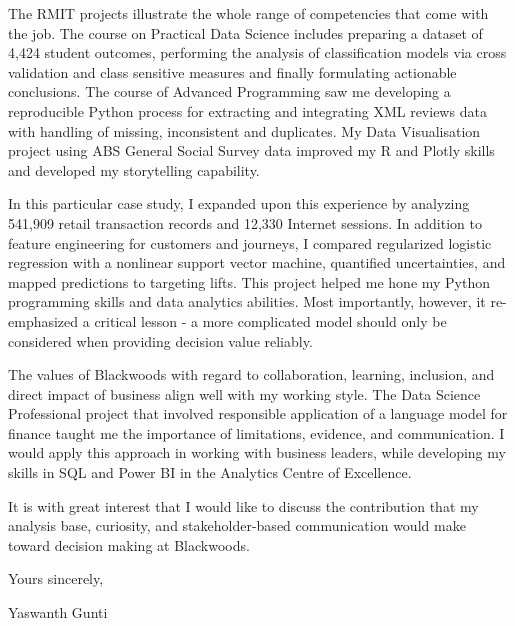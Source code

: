 \medskip
\noindent The RMIT projects illustrate the whole range of competencies that come with the job. The course on Practical Data Science includes preparing a dataset of 4,424 student outcomes, performing the analysis of classification models via cross validation and class sensitive measures and finally formulating actionable conclusions. The course of Advanced Programming saw me developing a reproducible Python process for extracting and integrating XML reviews data with handling of missing, inconsistent and duplicates. My Data Visualisation project using ABS General Social Survey data improved my R and Plotly skills and developed my storytelling capability.

\medskip
\noindent In this particular case study, I expanded upon this experience by analyzing 541,909 retail transaction records and 12,330 Internet sessions. In addition to feature engineering for customers and journeys, I compared regularized logistic regression with a nonlinear support vector machine, quantified uncertainties, and mapped predictions to targeting lifts. This project helped me hone my Python programming skills and data analytics abilities. Most importantly, however, it re-emphasized a critical lesson - a more complicated model should only be considered when providing decision value reliably.

\medskip
\noindent The values of Blackwoods with regard to collaboration, learning, inclusion, and direct impact of business align well with my working style. The Data Science Professional project that involved responsible application of a language model for finance taught me the importance of limitations, evidence, and communication. I would apply this approach in working with business leaders, while developing my skills in SQL and Power BI in the Analytics Centre of Excellence.

\medskip
\noindent It is with great interest that I would like to discuss the contribution that my analysis base, curiosity, and stakeholder-based communication would make toward decision making at Blackwoods.

\medskip
\noindent Yours sincerely,

\medskip
\noindent Yaswanth Gunti

